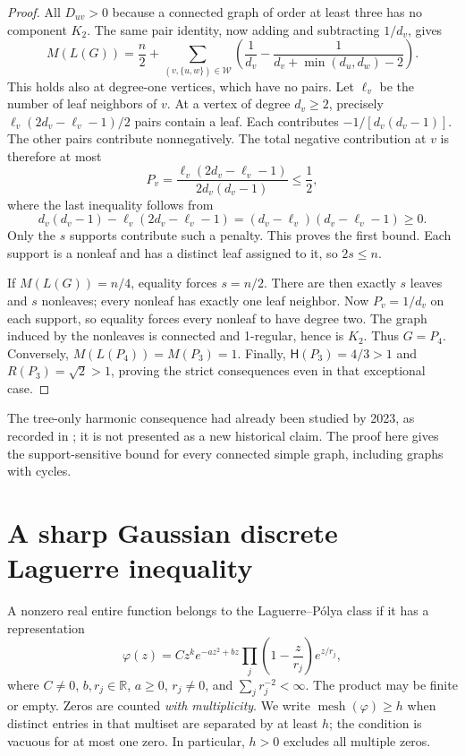 \documentclass[11pt]{article}
\theoremstyle{remark}\newtheorem{remark}[theorem]{Remark}
\newcommand{\R}{\mathbb R}
\newcommand{\W}{\mathcal W}
\DeclareMathOperator{\mesh}{mesh}
\begin{document}
\begin{proof}
All $D_{uv}>0$ because a connected graph of order at least three has no
component $K_2$. The same pair identity, now adding and subtracting
$1/d_v$, gives
\begin{equation}\label{eq:all-graph-identity}
 M(L(G))=\frac n2+
 \sum_{(v,\{u,w\})\in\W}
 \left(\frac1{d_v}-\frac1{d_v+\min(d_u,d_w)-2}\right).
\end{equation}
This holds also at degree-one vertices, which have no pairs.
Let $\ell_v$ be the number of leaf neighbors of $v$. At a vertex of degree
$d_v\ge2$, precisely $\ell_v(2d_v-\ell_v-1)/2$ pairs contain a leaf.
Each contributes $-1/[d_v(d_v-1)]$. The other pairs contribute nonnegatively.
The total negative contribution at $v$ is therefore at most
\[
 P_v=\frac{\ell_v(2d_v-\ell_v-1)}{2d_v(d_v-1)}\le\frac12,
\]
where the last inequality follows from
\[
 d_v(d_v-1)-\ell_v(2d_v-\ell_v-1)
 =(d_v-\ell_v)(d_v-\ell_v-1)\ge0.
\]
Only the $s$ supports contribute such a penalty. This proves the first
bound. Each support is a nonleaf and has a distinct leaf assigned to it,
so $2s\le n$.

If $M(L(G))=n/4$, equality forces $s=n/2$. There are then exactly $s$
leaves and $s$ nonleaves; every nonleaf has exactly one leaf neighbor.
Now $P_v=1/d_v$ on each support, so equality forces every nonleaf to
have degree two. The graph induced by the nonleaves is connected and
1-regular, hence is $K_2$. Thus $G=P_4$. Conversely,
$M(L(P_4))=M(P_3)=1$. Finally,
$\mathsf H(P_3)=4/3>1$ and $R(P_3)=\sqrt2>1$, proving the strict
consequences even in that exceptional case.
\end{proof}

The tree-only harmonic consequence had already been studied by 2023,
as recorded in \cite{ZZ}; it is not presented as a new historical claim.
The proof here gives the support-sensitive bound for every connected
simple graph, including graphs with cycles.

\section{A sharp Gaussian discrete Laguerre inequality}

A nonzero real entire function belongs to the Laguerre--P\'olya class if
it has a representation
\begin{equation}\label{eq:LP-product}
 \varphi(z)=Cz^k e^{-az^2+bz}
 \prod_j\left(1-\frac z{r_j}\right)e^{z/r_j},
\end{equation}
where $C\ne0$, $b,r_j\in\R$, $a\ge0$, $r_j\ne0$, and
$\sum_jr_j^{-2}<\infty$. The product may be finite or empty.
Zeros are counted \emph{with multiplicity}. We write $\mesh(\varphi)\ge h$
when distinct entries in that multiset are separated by at least $h$;
the condition is vacuous for at most one zero. In particular, $h>0$
excludes all multiple zeros.
\end{document}
